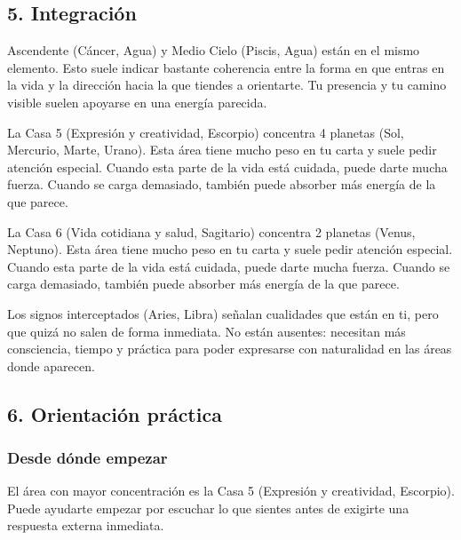 \documentclass[11pt,a4paper]{article}
\begin{document}
\vspace{0.5cm}

\subsection{5. Integración}

Ascendente (Cáncer, Agua) y Medio Cielo (Piscis, Agua) están en el mismo elemento. Esto suele indicar bastante coherencia entre la forma en que entras en la vida y la dirección hacia la que tiendes a orientarte. Tu presencia y tu camino visible suelen apoyarse en una energía parecida.

La Casa 5 (Expresión y creatividad, Escorpio) concentra 4 planetas (Sol, Mercurio, Marte, Urano). Esta área tiene mucho peso en tu carta y suele pedir atención especial. Cuando esta parte de la vida está cuidada, puede darte mucha fuerza. Cuando se carga demasiado, también puede absorber más energía de la que parece.

La Casa 6 (Vida cotidiana y salud, Sagitario) concentra 2 planetas (Venus, Neptuno). Esta área tiene mucho peso en tu carta y suele pedir atención especial. Cuando esta parte de la vida está cuidada, puede darte mucha fuerza. Cuando se carga demasiado, también puede absorber más energía de la que parece.

Los signos interceptados (Aries, Libra) señalan cualidades que están en ti, pero que quizá no salen de forma inmediata. No están ausentes: necesitan más consciencia, tiempo y práctica para poder expresarse con naturalidad en las áreas donde aparecen.

\vspace{0.5cm}

\subsection{6. Orientación práctica}

\subsubsection*{Desde dónde empezar}
El área con mayor concentración es la Casa 5 (Expresión y creatividad, Escorpio). Puede ayudarte empezar por escuchar lo que sientes antes de exigirte una respuesta externa inmediata.
\end{document}

